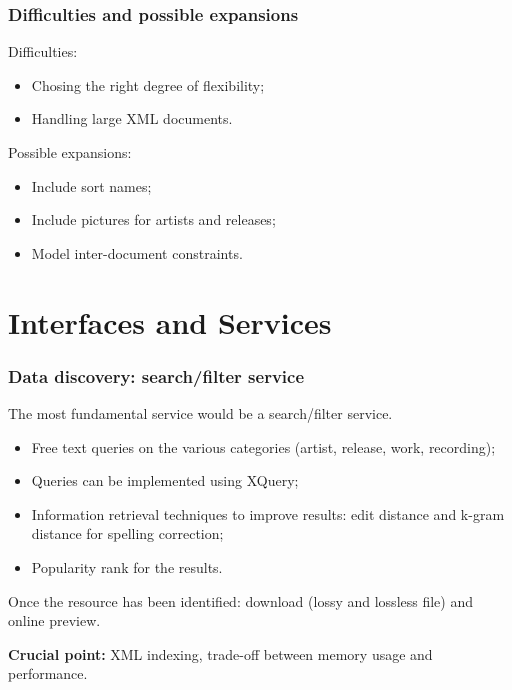 \documentclass{beamer}
\newcommand\rb[1]{\textcolor{ThemeRed}{\textbf{#1}}}
\begin{document}
  
  \begin{frame}
    \frametitle{Difficulties and possible expansions}
    
    Difficulties:
    
    \vspace{0.5em}
    
    \begin{itemize}
      \itemsep0.5em
      \item Chosing the right degree of flexibility;
      \item Handling large XML documents.      
    \end{itemize}

    \vspace{1em}
    
    Possible expansions:
    
    \vspace{0.5em}
    
    \begin{itemize}
      \itemsep0.5em
      \item Include sort names;
      \item Include pictures for artists and releases;
      \item Model inter-document constraints.
    \end{itemize}

  \end{frame}



\section{Interfaces and Services}

  \begin{frame}
    \frametitle{Data discovery: search/filter service}

    The most fundamental service would be a search/filter service.

    \vspace{0.5em}

    \begin{itemize}
      \item Free text queries on the various categories (artist, release, work, recording);
      \item Queries can be implemented using XQuery;
      \item Information retrieval techniques to improve results: edit distance and k-gram distance for spelling correction;
      \item Popularity rank for the results.
    \end{itemize}


    \vspace{1em}

    Once the resource has been identified: download (lossy and lossless file) and online preview.

    \vspace{1em}

    \rb{Crucial point:} XML indexing, trade-off between memory usage and performance.

  \end{frame}
\end{document}

